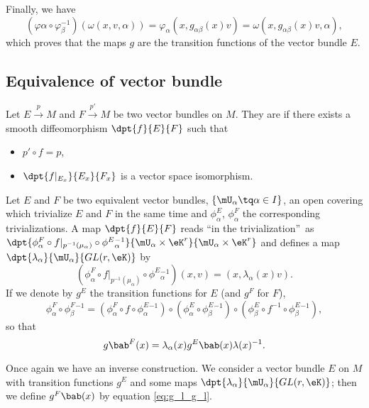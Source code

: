 Finally, we have
\begin{equation}
	(\varphi\alpha\circ\varphi_{\beta}^{-1})(\omega(x,v,\alpha))=\varphi_{\alpha}(x,g_{\alpha\beta}(x)v)
	=\omega(x,g_{\alpha\beta}(x)v,\alpha),
\end{equation}
which proves that the maps $g$ are the transition functions of the vector bundle $E$.

\subsection{Equivalence of vector bundle}

Let $E\stackrel{p}{\longrightarrow}M$ and $F\stackrel{p'}{\longrightarrow}M$ be two vector bundles on $M$. They are  if there exists a smooth diffeomorphism $\dpt{f}{E}{F}$ such that

\begin{itemize}
	\item $p'\circ f=p$,
	\item $\dpt{f|_{E_x}}{E_x}{F_x}$ is a vector space isomorphism.
\end{itemize}

Let $E$ and $F$ be two equivalent vector bundles, $\{\mU_{\alpha}\tq \alpha\in I\}$, an open covering which trivialize $E$ and $F$ in the same time and $\phi^E_{\alpha}$, $\phi^F_{\alpha}$ the corresponding trivializations. A map $\dpt{f}{E}{F}$ reads ``in the trivialization''\ as $\dpt{\phi^F_{\alpha}\circ f|_{p^{-1}(\mu_{\alpha})}\circ\phi^E{}^{-1}_{\alpha}}{\mU_{\alpha}\times\eK^r}{\mU_{\alpha}\times\eK^r}$ and defines a map $\dpt{\lambda_{\alpha}}{\mU_{\alpha}}{GL(r,\eK)}$ by
\begin{equation}
	(\phi^F_{\alpha}\circ f|_{p^{-1}(\mu_{\alpha})}\circ\phi^E{}^{-1}_{\alpha})(x,v)=(x,\lambda_{\alpha}(x)v).
\end{equation}
If we denote by $g^E$ the transition functions for $E$ (and $g^F$ for $F$),
\[
	\phi^F_{\alpha}\circ\phi^F_{\beta}{}^{-1}= (\phi^F_{\alpha}\circ f\circ\phi_{\alpha}^E{}^{-1})\circ
	(\phi^E_{\alpha}\circ\phi^E_{\beta}{}^{-1})\circ
	(\phi^E_{\beta}\circ f^{-1}\circ\phi_{\beta}^E{}^{-1}),
\]
so that
\begin{equation}\label{eq:g_l_g_l}
	g\bab^F(x)=\lambda_{\alpha}(x) g^E\bab(x)\lambda(x)^{-1}.
\end{equation}

Once again we have an inverse construction. We consider a vector bundle $E$ on $M$ with transition functions $g^E$ and some maps $\dpt{\lambda_{\alpha}}{\mU_{\alpha}}{GL(r,\eK)}$; then we define $g^F\bab(x)$ by equation \eqref{eq:g_l_g_l}.

